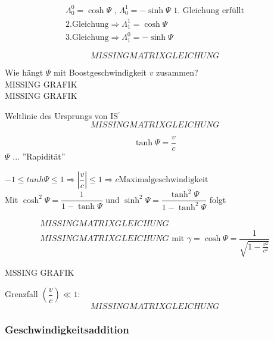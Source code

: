 \documentclass[a4paper, 11pt]{article}
\numberwithin{equation}{section}
\begin{document}
\begin{equation}
\begin{aligned}
\Lambda^0_0 = \cosh \Psi \text{  ,  } \Lambda^1_0 = - \sinh \Psi \text{  1. Gleichung erfüllt} \\
\text{2.Gleichung} \Rightarrow \Lambda ^1_1 = \cosh \Psi \\
\text{3.Gleichung} \Rightarrow \Lambda ^0_1 = -\sinh \Psi
\end{aligned}
\end{equation}

\begin{equation}
MISSING MATRIX GLEICHUNG
\end{equation}

Wie hängt $\Psi$ mit Boostgeschwindigkeit $v$ zusammen?\\
MISSING GRAFIK\\
MISSING GRAFIK

Weltlinie des Ursprungs von IS$^\prime$
\begin{equation*}
MISSING MATRIXGLEICHUNG
\end{equation*}

\begin{equation}
\boxed{
\tanh \Psi = \dfrac{v}{c}}
\end{equation}
$\Psi$ ... ''Rapidität''



$-1 \leq tanh \Psi \leq 1 \Rightarrow \left| \dfrac{v}{c} \right| \leq 1 \Rightarrow c \text{Maximalgeschwindigkeit}$\\
Mit $\cosh^2 \Psi = \dfrac{1}{1-\tanh \Psi}$ und $\sinh^2\Psi = \dfrac{\tanh^2\Psi}{1-\tanh^2 \Psi}$ folgt 

\begin{equation}
\begin{aligned}
MISSING MATRIXGLEICHUNG\\
\boxed{
MISSING MATRIXGLEICHUNG \text{  mit  } \gamma = \cosh \Psi = \dfrac{1}{\sqrt{1- \frac{v^2}{c^2}}}
}
\end{aligned}
\end{equation}

MSSING GRAFIK


Grenzfall $\left( \dfrac{v}{c} \right) \ll 1$:
\begin{equation*}
MISSING MATRIXGLEICHUNG
\end{equation*}


\subsubsection*{Geschwindigkeitsaddition}
\end{document}

